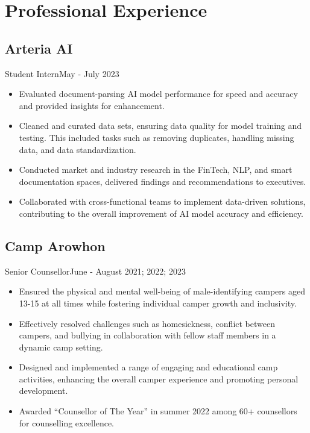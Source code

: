 \section{Professional Experience}
\subsection{Arteria AI}{Student Intern}{May - July 2023}
\begin{itemize}
    \item Evaluated document-parsing AI model performance for speed and accuracy and provided insights for enhancement.  
    \item Cleaned and curated data sets, ensuring data quality for model training and testing. This included tasks such as removing duplicates, handling missing data, and data standardization.
    \item Conducted market and industry research in the FinTech, NLP, and smart documentation spaces, delivered findings and recommendations to executives. 
    \item Collaborated with cross-functional teams to implement data-driven solutions, contributing to the overall improvement of AI model accuracy and efficiency.
\end{itemize}

\subsection{Camp Arowhon}{Senior Counsellor}{June - August 2021; 2022; 2023}
\begin{itemize}
    \item Ensured the physical and mental well-being of male-identifying campers aged 13-15 at all times while fostering individual camper growth and inclusivity. 
    \item Effectively resolved challenges such as homesickness, conflict between campers, and bullying in collaboration with fellow staff members in a dynamic camp setting.
    \item Designed and implemented a range of engaging and educational camp activities, enhancing the overall camper experience and promoting personal development.
    \item Awarded ``Counsellor of The Year'' in summer 2022 among 60+ counsellors for counselling excellence.
\end{itemize}
